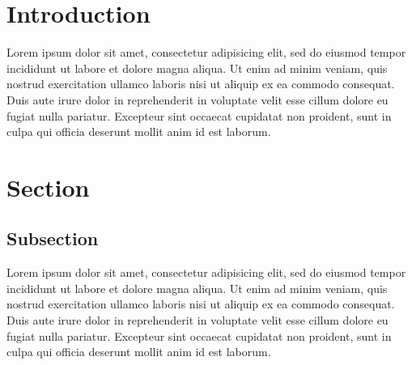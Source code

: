 \documentclass{article}				%
\title{\mytitle}	%
\author{\myauthor}	%
\date{\mydate}		%
\begin{document}
\thispagestyle{empty}

\maketitle

\begin{abstract}
\centering %
Short summary of the document aka abstract.
\end{abstract}

\tableofcontents

\thispagestyle{fancy} %


\section{Introduction}

Lorem ipsum dolor sit amet, consectetur adipisicing elit, sed do eiusmod tempor
incididunt ut labore et dolore magna aliqua. Ut enim ad minim veniam, quis
nostrud exercitation ullamco laboris nisi ut aliquip ex ea commodo consequat.
Duis aute irure dolor in reprehenderit in voluptate velit esse cillum dolore eu
fugiat nulla pariatur. Excepteur sint occaecat cupidatat non proident, sunt in
culpa qui officia deserunt mollit anim id est laborum.

\section{Section}

\subsection{Subsection}

Lorem ipsum dolor sit amet, consectetur adipisicing elit, sed do eiusmod tempor
incididunt ut labore et dolore magna aliqua. Ut enim ad minim veniam, quis
nostrud exercitation ullamco laboris nisi ut aliquip ex ea commodo consequat.
Duis aute irure dolor in reprehenderit in voluptate velit esse cillum dolore eu
fugiat nulla pariatur. Excepteur sint occaecat cupidatat non proident, sunt in
culpa qui officia deserunt mollit anim id est laborum.
\end{document}
